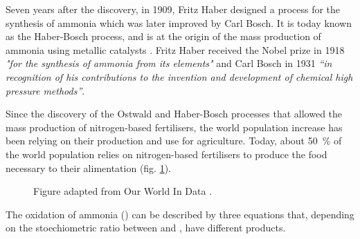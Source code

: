 Seven years after the discovery, in 1909, Fritz Haber designed a process for the synthesis of ammonia which was later improved by Carl Bosch.
It is today known as the Haber-Bosch process, and is at the origin of the mass production of ammonia using metallic catalysts \parencite{Hosmer1917, Parsons1919}.
Fritz Haber received the Nobel prize in 1918 \textit{"for the synthesis of ammonia from its elements"} \parencite{Alexander1920} and Carl Bosch in 1931 \textit{“in recognition of his contributions to the invention and development of chemical high pressure methods”}.

Since the discovery of the Ostwald and Haber-Bosch processes that allowed the mass production of nitrogen-based fertilisers, the world population increase has been relying on their production and use for agriculture.
Today, about \qty{50}{\percent} of the world population relies on nitrogen-based fertilisers to produce the food necessary to their alimentation (fig. \ref{fig:FertilizerWID}).

\begin{figure}[!htb]
\centering
    \caption{
    Figure adapted from Our World In Data \parencite{WorldDataFertilizer}.
    }
    \label{fig:FertilizerWID}
\end{figure}

The oxidation of ammonia () can be described by three equations that, depending on the stoechiometric ratio between  and , have different products.

